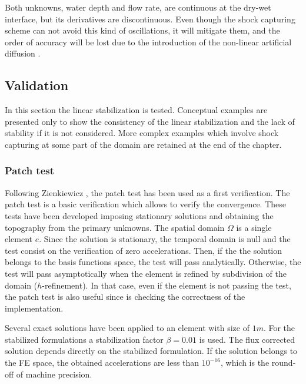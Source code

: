 Both unknowns, water depth and flow rate, are continuous at the dry-wet interface, but its derivatives are discontinuous. Even though the shock capturing scheme can not avoid this kind of oscillations, it will mitigate them, and the order of accuracy will be lost due to the introduction of the non-linear artificial diffusion \cite{badia2014}.





\subsection{Validation}


In this section the linear stabilization is tested. Conceptual examples are presented only to show the consistency of the linear stabilization and the lack of stability if it is not considered. More complex examples which involve shock capturing at some part of the domain are retained at the end of the chapter.




\subsubsection{Patch test}


Following Zienkiewicz \cite{zien1}, the patch test has been used as a first verification. The patch test is a basic verification which allows to verify the convergence. These tests have been developed imposing stationary solutions and obtaining the topography from the primary unknowns. The spatial domain $\Omega$ is a single element $e$.
Since the solution is stationary, the temporal domain is null and the test consist on the verification of zero accelerations.
Then, if the the solution belongs to the basis functions space, the test will pass analytically.
Otherwise, the test will pass asymptotically when the element is refined by subdivision of the domain ($h$-refinement). In that case, even if the element is not passing the test, the patch test is also useful since is checking the correctness of the implementation.

Several exact solutions have been applied to an element with size of $1m$. For the stabilized formulations a stabilization factor $\beta=0.01$ is used. The flux corrected solution depends directly on the stabilized formulation. If the solution belongs to the FE space, the obtained accelerations are less than $10^{-16}$, which is the round-off of machine precision.

